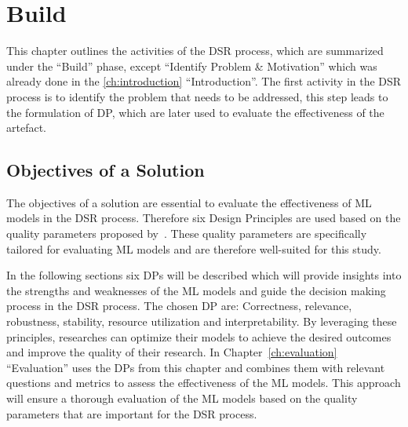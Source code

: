 \chapter{Build}\label{ch:build}
This chapter outlines the activities of the \ac{DSR} process, which are
summarized under the ``Build'' phase, except ``Identify Problem \& Motivation'' which was already done in the
\cref{ch:introduction} ``Introduction''.
The first activity in the DSR process is to identify the problem that needs to be addressed,
this step leads to the formulation of \ac{DP}, which are later used to evaluate
the effectiveness of the artefact.


\section{Objectives of a Solution}\label{sec:objectives-of-a-solution}

The objectives of a solution are essential to evaluate the effectiveness of ML models in the
DSR process.
Therefore six Design Principles are used based on the quality parameters proposed by~\cite{siebert2022construction}.
These quality parameters are specifically tailored for evaluating ML models and are therefore well-suited for this
study.

In the following sections six DPs will be described which will provide insights into the strengths and weaknesses of the
ML models and guide the decision making process in the DSR process.
The chosen \ac{DP} are: Correctness, relevance, robustness, stability, resource utilization and interpretability.
By leveraging these principles, researches can optimize their models to achieve the desired outcomes and improve the
quality of their research.
In Chapter~\ref{ch:evaluation} ``Evaluation'' uses the DPs from this chapter and combines them with relevant
questions and metrics to assess the effectiveness of the ML models.
This approach will ensure a thorough evaluation of the ML models based on the quality parameters that are important
for the DSR process.

